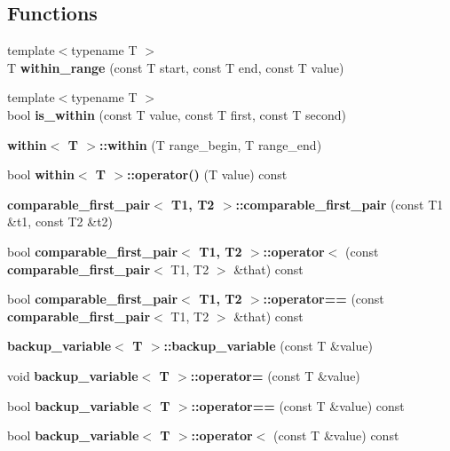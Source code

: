 \subsection*{Functions}
\begin{DoxyCompactItemize}
\item 
{\footnotesize template$<$typename T $>$ }\\T {\bf within\+\_\+range} (const T start, const T end, const T value)
\item 
{\footnotesize template$<$typename T $>$ }\\bool {\bf is\+\_\+within} (const T value, const T first, const T second)
\item 
{\bf within$<$ T $>$\+::within} (T range\+\_\+begin, T range\+\_\+end)
\item 
bool {\bf within$<$ T $>$\+::operator()} (T value) const 
\item 
{\bfseries comparable\+\_\+first\+\_\+pair$<$ T1, T2 $>$\+::comparable\+\_\+first\+\_\+pair} (const T1 \&t1, const T2 \&t2)\label{group___utilities_ga2983fa9fde1ab3b1edc13b8dd37a913a}

\item 
bool {\bfseries comparable\+\_\+first\+\_\+pair$<$ T1, T2 $>$\+::operator$<$} (const {\bf comparable\+\_\+first\+\_\+pair}$<$ T1, T2 $>$ \&that) const \label{group___utilities_ga67562f833f477f952e86f4d6dc39e118}

\item 
bool {\bfseries comparable\+\_\+first\+\_\+pair$<$ T1, T2 $>$\+::operator==} (const {\bf comparable\+\_\+first\+\_\+pair}$<$ T1, T2 $>$ \&that) const \label{group___utilities_gaeb65ed4ea3789b102e7ef750cb72d875}

\item 
{\bfseries backup\+\_\+variable$<$ T $>$\+::backup\+\_\+variable} (const T \&value)\label{group___utilities_ga5ffb4ce0ce0f679135ce70d8683a9182}

\item 
void {\bfseries backup\+\_\+variable$<$ T $>$\+::operator=} (const T \&value)\label{group___utilities_gae4c8c3147d8a341eb268f7b2332098d6}

\item 
bool {\bfseries backup\+\_\+variable$<$ T $>$\+::operator==} (const T \&value) const \label{group___utilities_gaec3207431e35f74efa6fe2af77ec734d}

\item 
bool {\bfseries backup\+\_\+variable$<$ T $>$\+::operator$<$} (const T \&value) const \label{group___utilities_gaf6d27d4c48c46816a5f82343609b24db}


\end{DoxyCompactItemize}
